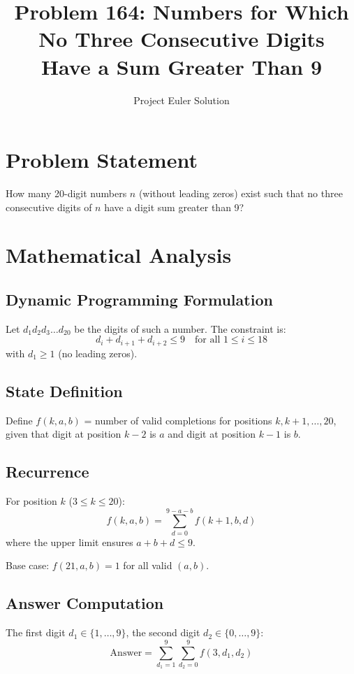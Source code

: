 \documentclass[12pt]{article}
\title{Problem 164: Numbers for Which No Three Consecutive Digits\\Have a Sum Greater Than 9}
\author{Project Euler Solution}
\date{}
\begin{document}
\maketitle

\section{Problem Statement}
How many 20-digit numbers $n$ (without leading zeros) exist such that no three consecutive digits of $n$ have a digit sum greater than 9?

\section{Mathematical Analysis}

\subsection{Dynamic Programming Formulation}

Let $d_1 d_2 d_3 \ldots d_{20}$ be the digits of such a number. The constraint is:
\[
d_i + d_{i+1} + d_{i+2} \leq 9 \quad \text{for all } 1 \leq i \leq 18
\]
with $d_1 \geq 1$ (no leading zeros).

\subsection{State Definition}

Define $f(k, a, b)$ = number of valid completions for positions $k, k+1, \ldots, 20$, given that digit at position $k-2$ is $a$ and digit at position $k-1$ is $b$.

\subsection{Recurrence}

For position $k$ ($3 \leq k \leq 20$):
\[
f(k, a, b) = \sum_{d=0}^{9-a-b} f(k+1, b, d)
\]
where the upper limit ensures $a + b + d \leq 9$.

Base case: $f(21, a, b) = 1$ for all valid $(a, b)$.

\subsection{Answer Computation}

The first digit $d_1 \in \{1, \ldots, 9\}$, the second digit $d_2 \in \{0, \ldots, 9\}$:
\[
\text{Answer} = \sum_{d_1=1}^{9} \sum_{d_2=0}^{9} f(3, d_1, d_2)
\]
\end{document}
